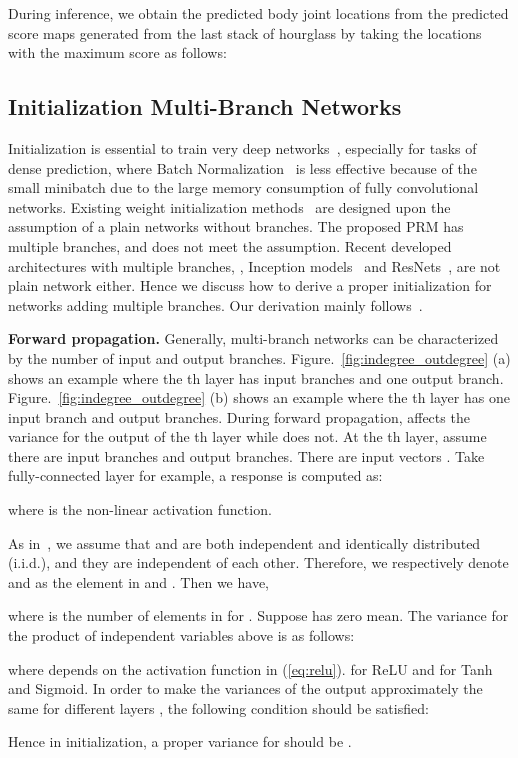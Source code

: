 \documentclass[10pt,twocolumn,letterpaper]{article}
\newcommand{\smalltitle}[1]{\vspace{0.2em}\noindent \textbf{{#1}}}
\begin{document}
During inference, we obtain the predicted body joint locations  from the predicted score maps generated from the last stack of hourglass by taking the locations with the maximum score as follows:
{\small

}

\vspace{-1em}
\subsection{Initialization Multi-Branch Networks}




Initialization is essential to train very deep networks~\cite{glorot2010understanding,simonyan2014very,he2015delving}, especially for tasks of dense prediction, where Batch Normalization~\cite{ioffe2015batch} is less effective because of the small minibatch due to the large memory consumption of fully convolutional networks.  
Existing weight initialization methods~\cite{krizhevsky2012imagenet,glorot2010understanding,he2015delving} are designed upon the assumption of a plain networks without branches. 
The proposed PRM has multiple branches, and does not meet the assumption. 
Recent developed architectures with multiple branches, \eg, Inception models~\cite{szegedy2015going,ioffe2015batch,szegedy2016rethinking,szegedy2016inception} and ResNets~\cite{he2016deep,he2016identity}, are not plain network either. 
Hence we discuss how to derive a proper initialization for networks adding multiple branches. 
Our derivation mainly follows~\cite{glorot2010understanding,he2015delving}. 



\smalltitle{Forward propagation. }
Generally, multi-branch networks can be characterized by the number of input and output branches. 
Figure.~\ref{fig:indegree_outdegree} (a) shows an example where the th layer has  input branches and one output branch. Figure.~\ref{fig:indegree_outdegree} (b) shows an example where the  th layer has one input branch and  output branches. 
During forward propagation,   affects the variance for the output of the th layer while  does not. 
At the th layer, assume there are  input branches and  output branches. There are  input vectors .
Take fully-connected layer for example, a response is computed as:
{\small

}
\!\!where  is the non-linear activation function.

As in~\cite{glorot2010understanding,he2015delving}, we assume that  and  are both independent and identically distributed (i.i.d.), and they are independent of each other. Therefore, we respectively denote  and  as  the element in  and .  Then we have,
{\small

}
\!\!where  is the number of elements in  for . Suppose  has zero mean. The variance for the product of independent variables above is as follows:
{\small

}
\!\!where  depends on the activation function  in (\ref{eq:relu}).  for ReLU and  for Tanh and Sigmoid. 
In order to make the variances of the output  approximately the same for different layers , the following condition should be satisfied:
{\small

}
\!\!Hence in initialization, a proper variance for  should be .
\end{document}
